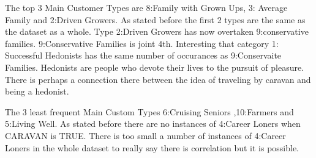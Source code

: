 \documentclass{article}\usepackage[]{graphicx}\usepackage[]{color}
\begin{document}
The top 3 Main Customer Types are 8:Family with Grown Ups, 3: Average Family and 2:Driven Growers. As stated before the first 2 types are the same as the dataset as a whole. Type 2:Driven Growers has now overtaken 9:conservative families. 9:Conservative Families is joint 4th. Interesting that category 1: Successful Hedonists has the same number of occurances as 9:Conservaite Families. Hedonists are people who devote their lives to the pursuit of pleasure. There is perhaps a connection there between the idea of traveling by caravan and being a hedonist. 

The 3 least frequent Main Custom Types 6:Cruising Seniors ,10:Farmers and 5:Living Well. As stated before there are no instances of 4:Career Loners when CARAVAN is TRUE. There is too small a number of instances of 4:Career Loners in the whole dataset to really say there is correlation but it is possible. 
\end{document}

